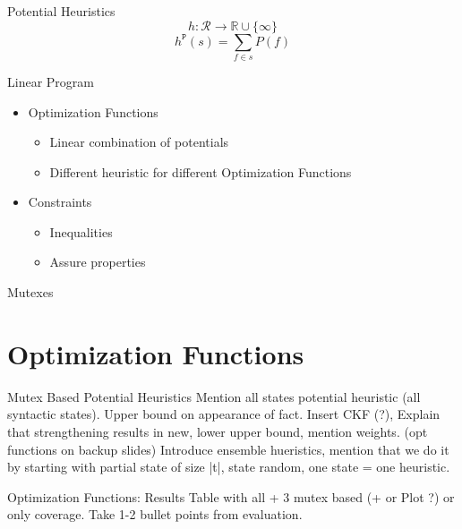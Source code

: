 \documentclass[aspectratio=169]{beamer}
\begin{document}
    \begin{frame}[c]{Potential Heuristics}
        \[h:\mathcal{R} \rightarrow \mathbb{R} \cup \{\infty\}\]
        \newline
        \[h^\mathtt{P}(s)=\sum_{f\in s}P(f)\]
    \end{frame}

    \begin{frame}[c]{Linear Program}
        \begin{itemize}
            \item Optimization Functions
                \begin{itemize}
                    \item Linear combination of potentials
                    \item Different heuristic for different Optimization Functions
                \end{itemize}
            \item Constraints
                \begin{itemize}
                    \item Inequalities
                    \item Assure properties
                \end{itemize}
        \end{itemize}
    \end{frame}

    \begin{frame}[c]{Mutexes}

    \end{frame}

    \section{Optimization Functions}
    \begin{frame}[c]{Mutex Based Potential Heuristics}
        Mention all states potential heuristic (all syntactic states). Upper bound on appearance of fact.
        Insert CKF (?), Explain that strengthening results in new, lower upper bound, mention weights.
        (opt functions on backup slides)
        Introduce ensemble hueristics, mention that we do it by starting with partial state of size |t|, state random, one state = one heuristic.
    \end{frame}

    \begin{frame}[c]{Optimization Functions: Results}
         Table with all + 3 mutex based (+ or Plot ?) or only coverage.
         Take 1-2 bullet points from evaluation.
    \end{frame}
\end{document}

